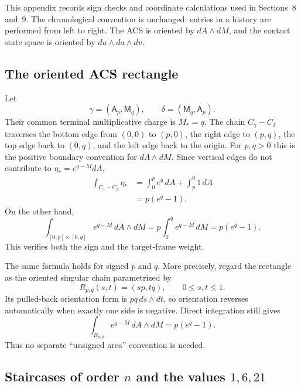 This appendix records sign checks and coordinate calculations used in
Sections~8 and~9.  The chronological convention is unchanged: entries in a
history are performed from left to right.  The ACS is oriented by
\(dA\wedge dM\), and the contact state space is oriented by
\(du\wedge da\wedge dv\).

\subsection{The oriented ACS rectangle}
\label{app:p0-acs-rectangle}

Let
\[
    \gamma=(\mathsf A_p,\mathsf M_q),
    \qquad
    \delta=(\mathsf M_q,\mathsf A_p).
\]
Their common terminal multiplicative charge is \(M_*=q\).  The chain
\(C_\gamma-C_\delta\) traverses the bottom edge from \((0,0)\) to \((p,0)\),
the right edge to \((p,q)\), the top edge back to \((0,q)\), and the left edge
back to the origin.  For \(p,q>0\) this is the positive boundary convention
for \(dA\wedge dM\).  Since vertical edges do not contribute to
\(\eta_*=e^{q-M}dA\),
\begin{align*}
    \int_{C_\gamma-C_\delta}\eta_*
      &=\int_0^p e^q\,dA+\int_p^0 1\,dA\\
      &=p(e^q-1).
\end{align*}
On the other hand,
\[
    \int_{[0,p]\times[0,q]}e^{q-M}\,dA\wedge dM
      =p\int_0^q e^{q-M}\,dM
      =p(e^q-1).
\]
This verifies both the sign and the target-frame weight.

The same formula holds for signed \(p\) and \(q\).  More precisely, regard the
rectangle as the oriented singular chain parametrized by
\[
    R_{p,q}(s,t)=(sp,tq),
    \qquad 0\le s,t\le1.
\]
Its pulled-back orientation form is \(pq\,ds\wedge dt\), so orientation
reverses automatically when exactly one side is negative.  Direct integration
still gives
\[
    \int_{R_{p,q}}e^{q-M}\,dA\wedge dM=p(e^q-1).
\]
Thus no separate ``unsigned area'' convention is needed.

\subsection{Staircases of order \(n\) and the values \(1,6,21\)}
\label{app:p0-staircase-counts}

